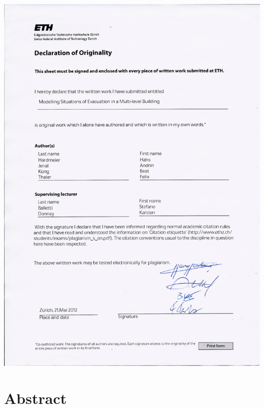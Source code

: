 \documentclass[11pt]{article}
\begin{document}



\includegraphics[width=\textwidth]{declaration_of_originality.jpg}


\newpage


\tableofcontents

\newpage




\section{Abstract}
\end{document}
